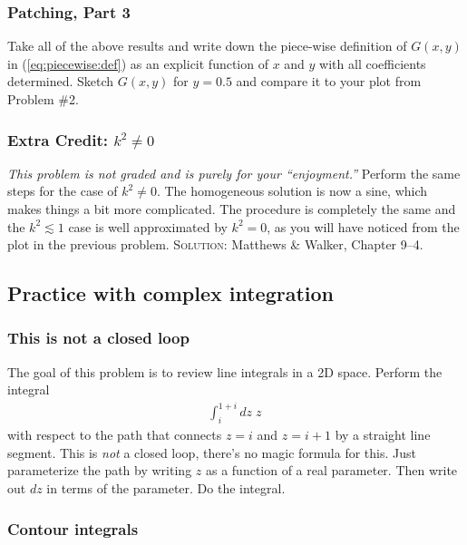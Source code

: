 \documentclass[12pt]{article}
\numberwithin{equation}{subsection}    %
\begin{document}
\subsubsection{Patching, Part 3}

Take all of the above results and write down the piece-wise definition of $G(x,y)$ in (\ref{eq:piecewise:def}) as an explicit function of $x$ and $y$ with all coefficients determined. Sketch $G(x,y)$  for $y=0.5$ and compare it to your plot from Problem \#2.

\subsubsection{Extra Credit: $k^2\neq 0$}

\emph{This problem is not graded and is purely for your ``enjoyment.''} Perform the same steps for the case of $k^2\neq 0$. The homogeneous solution is now a sine, which makes things a bit more complicated. The procedure is completely the same and the $k^2 \lesssim 1$ case is well approximated by $k^2=0$, as you will have noticed from the plot in the previous problem. \textsc{Solution}: Matthews \& Walker, Chapter 9--4. 








\subsection{Practice with complex integration}

\subsubsection{This is not a closed loop}

The goal of this problem is to review line integrals in a 2D space. Perform the integral
\begin{align}
	\int_i^{1+i} dz \; z \,
\end{align}
with respect to the path that connects $z=i$ and $z=i+1$ by a straight line segment. This is \emph{not} a closed loop, there's no magic formula for this. Just parameterize the path by writing $z$ as a function of a real parameter. Then write out $dz$ in terms of the parameter. Do the integral.

\subsubsection{Contour integrals}
\end{document}
